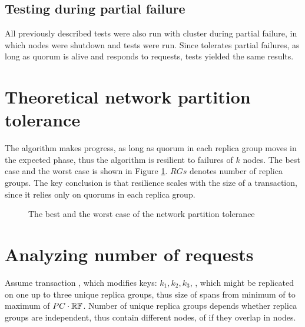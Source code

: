 \subsection{Testing during partial failure}

All previously described tests were also run with cluster during partial failure, in which nodes were shutdown and tests were run. Since \mpt tolerates partial failures, as long as quorum is alive and responds to requests, tests yielded the same results.

\section{Theoretical network partition tolerance}
The algorithm makes progress, as long as quorum in each replica group moves in the expected phase, thus the algorithm is resilient to failures of $k$ nodes. The best case and the worst case is shown in Figure \ref{fig:tests:networkPartitionTolerance}. $RGs$ denotes number of replica groups. The key conclusion is that resilience scales with the size of a transaction, since it relies only on quorums in each replica group.

\begin{figure}[hbt]
  \setlength{\unitlength}{1.3cm}  
  \caption{The best and the worst case of the network partition tolerance}
  \label{fig:tests:networkPartitionTolerance}
\end{figure}

\section{Analyzing number of requests}
Assume transaction \transaction, which modifies keys: $k_{1}, k_{2}, k_{3}$,
, which might be replicated on one up to three unique replica groups, thus size of \nodesTx spans from minimum of \RFalone to maximum of $PC\cdot\mathbb{RF}$. Number of unique replica groups depends whether replica groups are independent, thus contain different nodes, of if they overlap in nodes.

